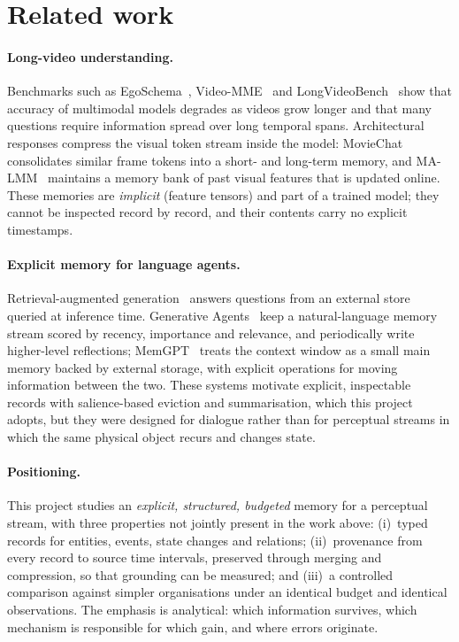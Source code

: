 \section{Related work}\label{sec:related}

\paragraph{Long-video understanding.}
Benchmarks such as EgoSchema~\citep{mangalam2023egoschema},
Video-MME~\citep{fu2024videomme} and LongVideoBench~\citep{wu2024longvideobench}
show that accuracy of multimodal models degrades as videos grow longer and
that many questions require information spread over long temporal spans.
Architectural responses compress the visual token stream inside the model:
MovieChat~\citep{song2024moviechat} consolidates similar frame tokens into a
short- and long-term memory, and MA-LMM~\citep{he2024malmm} maintains a memory
bank of past visual features that is updated online. These memories are
\emph{implicit} (feature tensors) and part of a trained model; they cannot be
inspected record by record, and their contents carry no explicit timestamps.

\paragraph{Explicit memory for language agents.}
Retrieval-augmented generation~\citep{lewis2020rag} answers questions from an
external store queried at inference time. Generative
Agents~\citep{park2023generative} keep a natural-language memory stream scored
by recency, importance and relevance, and periodically write higher-level
reflections; MemGPT~\citep{packer2023memgpt} treats the context window as a
small main memory backed by external storage, with explicit operations for
moving information between the two. These systems motivate explicit,
inspectable records with salience-based eviction and summarisation, which this
project adopts, but they were designed for dialogue rather than for
perceptual streams in which the same physical object recurs and changes state.

\paragraph{Positioning.}
This project studies an \emph{explicit, structured, budgeted} memory for a
perceptual stream, with three properties not jointly present in the work
above: (i)~typed records for entities, events, state changes and relations;
(ii)~provenance from every record to source time intervals, preserved through
merging and compression, so that grounding can be measured; and (iii)~a
controlled comparison against simpler organisations under an identical budget
and identical observations. The emphasis is analytical: which information
survives, which mechanism is responsible for which gain, and where errors
originate.

